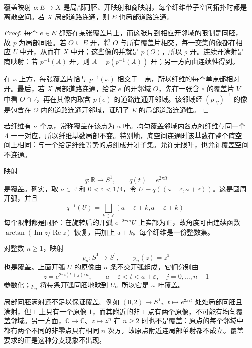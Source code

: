 \begin{proposition}\label{g1:prop:covering-local-properties}
	覆盖映射 \(p:E\to X\) 是局部同胚、开映射和商映射，每个纤维带子空间拓扑时都是离散空间。若 \(X\) 局部道路连通，则 \(E\) 也局部道路连通。
\end{proposition}
\begin{proof}
	每个 \(e\in E\) 都落在某张覆盖片上，而这张片到相应开邻域的限制是同胚，故 \(p\) 为局部同胚。若 \(O\subseteq E\) 开，将 \(O\) 与所有覆盖片相交，每一交集的像都在相应 \(U\) 中开，从而在 \(X\) 中开；这些像的并就是 \(p(O)\)，所以 \(p\) 开。连续开满射是商映射：若 \(p^{-1}(A)\) 开，则 \(A=p(p^{-1}(A))\) 开；另一方向由连续性得到。

	在 \(x\) 上方，每张覆盖片恰与 \(p^{-1}(x)\) 相交于一点，所以纤维的每个单点都相对开。最后，若 \(X\) 局部道路连通，给定 \(e\) 的开邻域 \(O\)，先在一张含 \(e\) 的覆盖片 \(V\) 中看 \(O\cap V\)，再在其像内取含 \(p(e)\) 的道路连通开邻域。该邻域经 \((p|_V)^{-1}\) 的像是包含在 \(O\) 内的道路连通开邻域，证明了 \(E\) 的局部道路连通性。
\end{proof}

若纤维有 \(n\) 个点，常称覆盖在该点为 \(n\) 叶。均匀覆盖邻域内各点的纤维与同一个 \(\Lambda\) 一一对应，所以纤维基数局部不变。特别地，底空间连通时该基数在整个底空间上相同：与一个给定纤维等势的点组成开闭子集。允许无限叶，也允许覆盖空间不连通。

\begin{example}\label{g1:exm:circle-coverings}
	映射
	\[
		q:\mathbb R\longrightarrow S^1,\qquad q(t)=e^{2\pi it}
	\]
	是覆盖。确实，取 \(a\in\mathbb R\) 和 \(0<\varepsilon<1/4\)，令 \(U=q((a-\varepsilon,a+\varepsilon))\)。这是圆周开弧，并且
	\[
		q^{-1}(U)=\bigsqcup_{k\in\mathbb Z}(a-\varepsilon+k,a+\varepsilon+k).
	\]
	每个限制都是同胚：在旋转后的开弧 \(e^{-2\pi ia}U\) 上实部为正，故角度可由连续函数 \(\arctan(\operatorname{Im}z/\operatorname{Re}z)\) 恢复，再加上 \(a+k\)。每个纤维是一份整数集。

	对整数 \(n\ge1\)，映射
	\[
		p_n:S^1\longrightarrow S^1,\qquad p_n(z)=z^n
	\]
	也是覆盖。上面开弧 \(U\) 的原像由 \(n\) 条不交开弧组成，它们分别由
	\[
		z=e^{2\pi i(t+j)/n},\qquad
		a-\varepsilon<t<a+\varepsilon,\quad j=0,\ldots,n-1
	\]
	参数化；\(p_n\) 将每条开弧同胚地映到 \(U\)。所以它是 \(n\) 叶覆盖。
\end{example}

局部同胚满射还不足以保证覆盖。例如 \((0,2)\to S^1\)、\(t\mapsto e^{2\pi it}\) 处处局部同胚且满射，但 \(1\) 上只有一个原像 \(1\)，而其附近的非 \(1\) 点有两个原像，不可能有均匀覆盖邻域。另一方面，\(\mathbb C\to\mathbb C\)、\(z\mapsto z^n\) 在 \(n\ge2\) 时也不是覆盖：原点的每个邻域中都有两个不同的非零点具有相同 \(n\) 次方，故原点附近连局部单射都不成立。覆盖要求的正是这种分支现象不出现。

